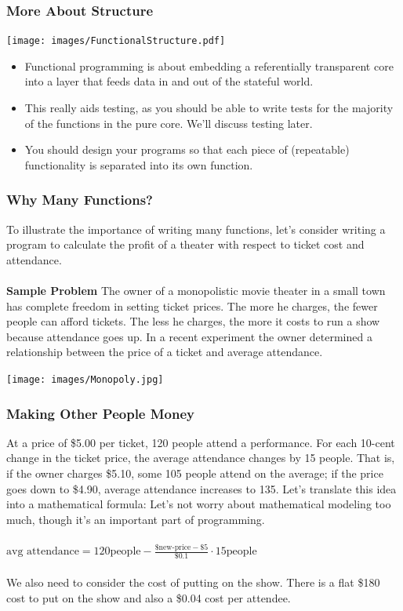 \documentclass{beamer}
\begin{document}
\begin{frame}
  \frametitle{More About Structure}
  \begin{center}
    \texttt{[image: images/FunctionalStructure.pdf]}
  \end{center}
  \begin{itemize}
  \item<2-> Functional programming is about embedding a referentially transparent
    core into a layer that feeds data in and out of the stateful world.
  \item<3-> This really aids testing, as you should be able to write tests for
    the majority of the functions in the pure core. We'll discuss testing later.
  \item<4-> You should design your programs so that each piece of
    (repeatable) functionality is separated into its own function.
  \end{itemize}
\end{frame}

\begin{frame}
  \frametitle{Why Many Functions?}
  To illustrate the importance of writing many functions, let's consider
  writing a program to calculate the profit of a theater with respect to
  ticket cost and attendance.
  \pause
  \\ \\
  \textbf{Sample Problem} The owner of a monopolistic movie theater in a small town has complete freedom in setting ticket prices. The more he charges, the fewer people can afford tickets. The less he charges, the more it costs to run a show because attendance goes up. In a recent experiment the owner determined a relationship between the price of a ticket and average attendance.
  \pause
  \begin{center}
    \texttt{[image: images/Monopoly.jpg]}
  \end{center}
\end{frame}

\begin{frame}
  \frametitle{Making Other People Money}
  At a price of \$5.00 per ticket, 120 people attend a performance. For each 10-cent change in the ticket price, the average attendance changes by 15 people. That is, if the owner charges \$5.10, some 105 people attend on the average; if the price goes down to \$4.90, average attendance increases to 135. Let’s translate this idea into a mathematical formula:
  \pause
  Let's not worry about mathematical modeling too much, though  it's an important
  part of programming.
  \\ \\
  \pause
  $\text{avg attendance}=120\text{people}-\frac{\text{\$new-price}-\$5}{\$0.1} \cdot 15 \text{people}$
  \\ \\
  \pause
  We also need to consider the cost of putting on the show. There is a flat \$180
  cost to put on the show and also a \$0.04 cost per attendee.
\end{frame}
\end{document}
